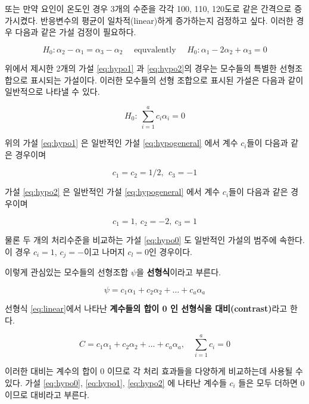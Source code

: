 \documentclass[
]{book}
\begin{document}
또는 만약 요인이 온도인 경우 3개의 수준을 각각 100, 110, 120도로 같은 간격으로 증가시켰다.
반응변수의 평균이 일차적(linear)하게 증가하는지 검정하고 싶다. 이러한 경우 다음과 같은
가설 검정이 필요하다.

\begin{equation}
H_0 : \alpha_2 - \alpha_1 = \alpha_3 - \alpha_2  \quad \text{ equvalently } \quad H_0: \alpha_1 - 2 \alpha_2 + \alpha_3 =0 
\label{eq:hypo2}
\end{equation}

위에서 제시한 2개의 가설 \eqref{eq:hypo1} 과 \eqref{eq:hypo2}의 경우는 모수들의 특별한 선형조합으로 표시되는 가설이다. 이러한 모수들의 선형 조합으로 표시된 가설은 다음과 같이 일반적으로 나타낼 수 있다.

\begin{equation}
H_0: ~ \sum_{i=1}^a c_i \alpha_i = 0
\label{eq:hypogeneral}
\end{equation}

위의 가설 \eqref{eq:hypo1} 은 일반적인 가설 \eqref{eq:hypogeneral} 에서 계수 \(c_i\)들이 다음과 같은 경우이며

\[ c_1 = c_2 = 1/2, ~~c_3 =-1 \]

가설 \eqref{eq:hypo2} 은 일반적인 가설 \eqref{eq:hypogeneral} 에서 계수 \(c_i\)들이 다음과 같은 경우이며

\[ c_1 = 1, ~ c_2= -2,~ c_3 =1 \]

물론 두 개의 처리수준을 비교하는 가설 \eqref{eq:hypo0} 도 일반적인 가설의 범주에 속한다. 이 경우 \(c_i=1\), \(c_j=-\)이고 나머지 \(c_l=0\)인 경우이다.

이렇게 관심있는 모수들의 선형조합 \(\psi\)을 \textbf{선형식}이라고 부른다.

\begin{equation}
\psi = c_1 \alpha_1 + c_2 \alpha_2 + \dots + c_a \alpha_a
\label{eq:linear}
\end{equation}

선형식 \eqref{eq:linear}에서 나타난 \textbf{계수들의 합이 0 인 선형식을 대비(contrast)}라고 한다.

\begin{equation}
C = c_1 \alpha_1 + c_2 \alpha_2 + \dots + c_a \alpha_a, \quad \sum_{i=1}^a c_i =0
\label{eq:contrast}
\end{equation}

이러한 대비는 계수의 합이 0 이므로 각 처리 효과들을 다양하게 비교하는데 사용될 수 있다. 가설 \eqref{eq:hypo0}, \eqref{eq:hypo1}, \eqref{eq:hypo2} 에 나타난 계수들 \(c_i\) 들은 모두 더하면 0이므로 대비라고 부른다.
\end{document}
